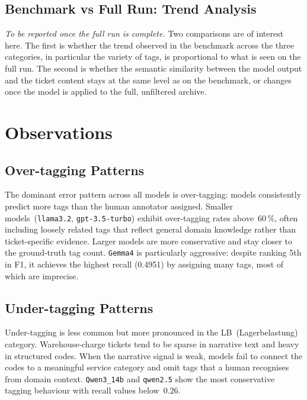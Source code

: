 \subsection{Benchmark vs Full Run: Trend Analysis}
%
\textit{To be reported once the full run is complete.}  Two comparisons are of
interest here.  The first is whether the trend observed in the benchmark across
the three categories, in particular the variety of tags, is proportional to
what is seen on the full run.  The second is whether the semantic similarity
between the model output and the ticket content stays at the same level as on
the benchmark, or changes once the model is applied to the full, unfiltered
archive.

\section{Observations}
\label{sec:observations}
%
\subsection{Over-tagging Patterns}
%
The dominant error pattern across all models is over-tagging: models
consistently predict more tags than the human annotator assigned.  Smaller
models~(\texttt{llama3.2}, \texttt{gpt-3.5-turbo}) exhibit over-tagging
rates above~60\,\%, often including loosely related tags that reflect
general domain knowledge rather than ticket-specific evidence.  Larger
models are more conservative and stay closer to the ground-truth tag count.
\texttt{Gemma4} is particularly aggressive: despite ranking 5th in F1, it
achieves the highest recall (0.4951) by assigning many tags, most of which
are imprecise.

\subsection{Under-tagging Patterns}
%
Under-tagging is less common but more pronounced in the LB~(Lagerbelastung)
category.  Warehouse-charge tickets tend to be sparse in narrative text and
heavy in structured codes.  When the narrative signal is weak, models
fail to connect the codes to a meaningful service category and omit tags
that a human recognises from domain context.  \texttt{Qwen3\_14b} and
\texttt{qwen2.5} show the most conservative tagging behaviour with recall
values below~0.26.

